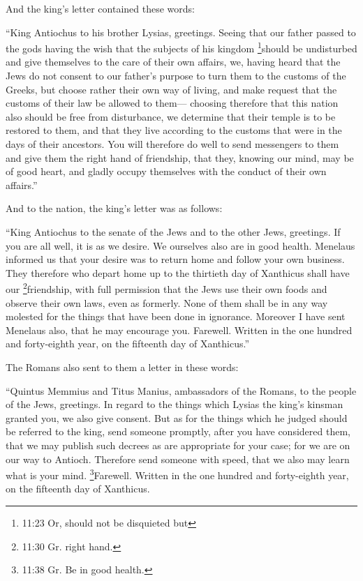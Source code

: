  And the king's letter contained these words:

``King Antiochus to his brother Lysias, greetings.  Seeing
that our father passed to the gods having the wish that the subjects of
his kingdom \footnote{11:23 Or, should not be disquieted but}should be
undisturbed and give themselves to the care of their own affairs,
 we, having heard that the Jews do not consent to our
father's purpose to turn them to the customs of the Greeks, but choose
rather their own way of living, and make request that the customs of
their law be allowed to them---  choosing therefore that
this nation also should be free from disturbance, we determine that
their temple is to be restored to them, and that they live according to
the customs that were in the days of their ancestors.  You
will therefore do well to send messengers to them and give them the
right hand of friendship, that they, knowing our mind, may be of good
heart, and gladly occupy themselves with the conduct of their own
affairs.''

 And to the nation, the king's letter was as follows:

``King Antiochus to the senate of the Jews and to the other Jews,
greetings.  If you are all well, it is as we desire. We
ourselves also are in good health.  Menelaus informed us
that your desire was to return home and follow your own business.
 They therefore who depart home up to the thirtieth day of
Xanthicus shall have our \footnote{11:30 Gr. right hand.}friendship,
with full permission  that the Jews use their own foods and
observe their own laws, even as formerly. None of them shall be in any
way molested for the things that have been done in ignorance.
 Moreover I have sent Menelaus also, that he may encourage
you.  Farewell. Written in the one hundred and forty-eighth
year, on the fifteenth day of Xanthicus.''

 The Romans also sent to them a letter in these words:

``Quintus Memmius and Titus Manius, ambassadors of the Romans, to the
people of the Jews, greetings.  In regard to the things
which Lysias the king's kinsman granted you, we also give consent.
 But as for the things which he judged should be referred
to the king, send someone promptly, after you have considered them, that
we may publish such decrees as are appropriate for your case; for we are
on our way to Antioch.  Therefore send someone with speed,
that we also may learn what is your mind. 
\footnote{11:38 Gr. Be in good health.}Farewell. Written in the one
hundred and forty-eighth year, on the fifteenth day of Xanthicus.

